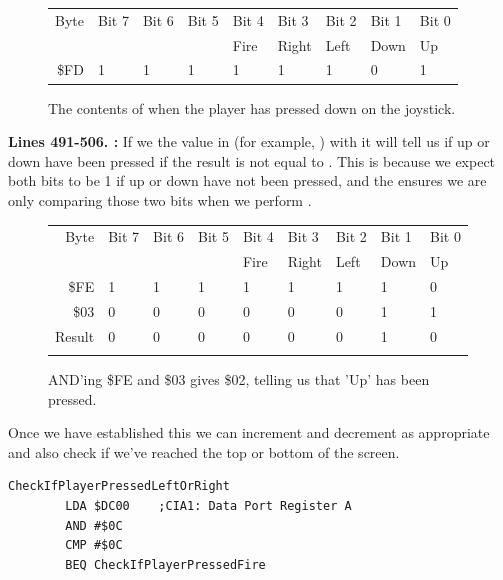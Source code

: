 {\begin{figure}[H]
{\begin{adjustbox}{width=7cm,center}
      \begin{tabular}{rllllllll}
        \toprule
        Byte & Bit 7 & Bit 6 & Bit 5 & Bit 4 & Bit 3 & Bit 2 & Bit 1 & Bit 0        \\
             &       &       &       & Fire  & Right & Left  & Down  & Up           \\
        \midrule
        \$FD & 1 & 1 & 1 & 1 & 1 & 1 & 0 & 1 \\
        \bottomrule
      \end{tabular}
    \end{adjustbox}
  }\caption*{The contents of  when the player has pressed down on the joystick.}
\end{figure}

\textbf{Lines 491-506. :} If we  the value in  (for
example, ) with
 it will tell us if up or down have been pressed if the result is not equal to . This is because
we expect both bits to be 1 if up or down have not been pressed, and the  ensures we are only comparing those
two bits when we perform .
\begin{figure}[H]
  {
    \setlength{\tabcolsep}{3.0pt}
    \setlength\cmidrulewidth{\heavyrulewidth} %
    \begin{adjustbox}{width=7cm,center}

      \begin{tabular}{rllllllll}
        \toprule
        Byte & Bit 7 & Bit 6 & Bit 5 & Bit 4 & Bit 3 & Bit 2 & Bit 1 & Bit 0        \\
             &       &       &       & Fire  & Right & Left  & Down  & Up           \\
        \midrule
        \$FE & 1 & 1 & 1 & 1 & 1 & 1 & 1 & 0 \\
        \$03 & 0 & 0 & 0 & 0 & 0 & 0 & 1 & 1 \\
        \midrule
        Result & 0 & 0 & 0 & 0 & 0 & 0 & 1 & 0 \\
        \addlinespace
        \bottomrule
      \end{tabular}
    \end{adjustbox}
    }\caption*{AND'ing \$FE and \$03 gives \$02, telling us that 'Up' has been pressed.}
\end{figure}

Once we have established this we can increment and decrement  as appropriate and also check
if we've reached the top or bottom of the screen. 
\clearpage
\begin{lstlisting}[caption= Second part of the Interrupt Handler.]
CheckIfPlayerPressedLeftOrRight   
        LDA $DC00    ;CIA1: Data Port Register A
        AND #$0C
        CMP #$0C
        BEQ CheckIfPlayerPressedFire


\end{lstlisting}}
